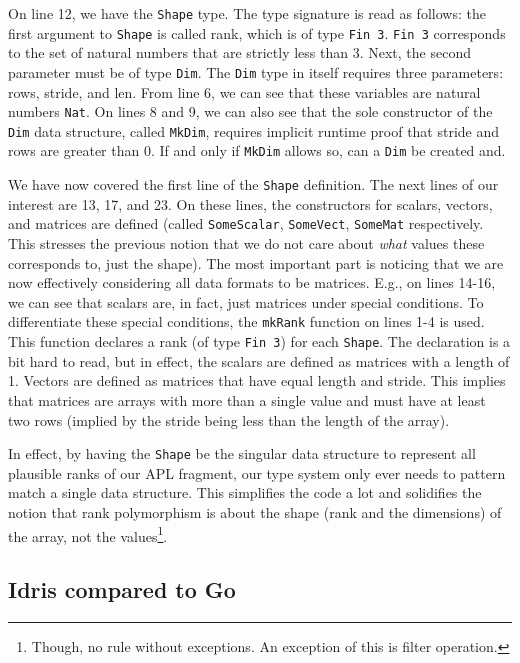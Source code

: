 \documentclass{report}
\begin{document}
On line 12, we have the \verb|Shape| type. The type signature is read as follows: the first argument to \verb|Shape| is called rank, which is of type \verb|Fin 3|. \verb|Fin 3| corresponds to the set of natural numbers that are strictly less than 3. Next, the second parameter must be of type \verb|Dim|. The \verb|Dim| type in itself requires three parameters: rows, stride, and len. From line 6, we can see that these variables are natural numbers \verb|Nat|. On lines 8 and 9, we can also see that the sole constructor of the \verb|Dim| data structure, called \verb|MkDim|, requires implicit runtime proof that stride and rows are greater than 0. If and only if \verb|MkDim| allows so, can a \verb|Dim| be created and.

We have now covered the first line of the \verb|Shape| definition. The next lines of our interest are 13, 17, and 23. On these lines, the constructors for scalars, vectors, and matrices are defined (called \verb|SomeScalar|, \verb|SomeVect|, \verb|SomeMat| respectively. This stresses the previous notion that we do not care about \emph{what} values these corresponds to, just the shape). The most important part is noticing that we are now effectively considering all data formats to be matrices. E.g., on lines 14-16, we can see that scalars are, in fact, just matrices under special conditions. To differentiate these special conditions, the \verb|mkRank| function on lines 1-4 is used. This function declares a rank (of type \verb|Fin 3|) for each \verb|Shape|. The declaration is a bit hard to read, but in effect, the scalars are defined as matrices with a length of 1. Vectors are defined as matrices that have equal length and stride. This implies that matrices are arrays with more than a single value and must have at least two rows (implied by the stride being less than the length of the array). 

In effect, by having the \verb|Shape| be the singular data structure to represent all plausible ranks of our APL fragment, our type system only ever needs to pattern match a single data structure. This simplifies the code a lot and solidifies the notion that rank polymorphism is about the shape (rank and the dimensions) of the array, not the values\footnote{Though, no rule without exceptions. An exception of this is filter operation.}.

\subsection{Idris compared to Go}
\end{document}
